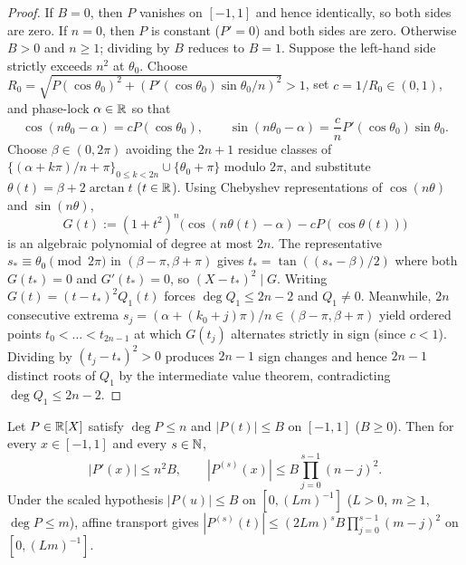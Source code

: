 \begin{proof}
If $B = 0$, then $P$ vanishes on $[-1, 1]$ and hence identically, so both sides are zero. If $n = 0$, then $P$ is constant ($P' = 0$) and both sides are zero. Otherwise $B > 0$ and $n \ge 1$; dividing by $B$ reduces to $B = 1$. Suppose the left-hand side strictly exceeds $n^2$ at $\theta_0$. Choose $R_0 = \sqrt{P(\cos\theta_0)^2 + (P'(\cos\theta_0)\sin\theta_0 / n)^2} > 1$, set $c = 1/R_0 \in (0, 1)$, and phase-lock $\alpha \in \mathbb{R}$ so that
\[
\cos(n\theta_0 - \alpha) = c P(\cos\theta_0), \qquad
\sin(n\theta_0 - \alpha) = \frac{c}{n} P'(\cos\theta_0)\sin\theta_0.
\]
Choose $\beta \in (0, 2\pi)$ avoiding the $2n + 1$ residue classes of $\{(\alpha + k\pi)/n + \pi\}_{0 \le k < 2n} \cup \{\theta_0 + \pi\}$ modulo $2\pi$, and substitute $\theta(t) = \beta + 2\arctan t$ ($t \in \mathbb{R}$). Using Chebyshev representations of $\cos(n\theta)$ and $\sin(n\theta)$,
\[
G(t) := (1 + t^2)^n \bigl(\cos(n\theta(t) - \alpha) - c P(\cos\theta(t))\bigr)
\]
is an algebraic polynomial of degree at most $2n$. The representative $s_* \equiv \theta_0 \pmod{2\pi}$ in $(\beta - \pi, \beta + \pi)$ gives $t_* = \tan((s_* - \beta)/2)$ where both $G(t_*) = 0$ and $G'(t_*) = 0$, so $(X - t_*)^2 \mid G$. Writing $G(t) = (t - t_*)^2 Q_1(t)$ forces $\deg Q_1 \le 2n - 2$ and $Q_1 \ne 0$. Meanwhile, $2n$ consecutive extrema $s_j = (\alpha + (k_0 + j)\pi)/n \in (\beta - \pi, \beta + \pi)$ yield ordered points $t_0 < \dots < t_{2n-1}$ at which $G(t_j)$ alternates strictly in sign (since $c < 1$). Dividing by $(t_j - t_*)^2 > 0$ produces $2n - 1$ sign changes and hence $2n - 1$ distinct roots of $Q_1$ by the intermediate value theorem, contradicting $\deg Q_1 \le 2n - 2$.
\end{proof}

\begin{theorem}
\label{thm:markov-interior}
\leanok
Let $P \in \mathbb{R}[X]$ satisfy $\deg P \le n$ and $|P(t)| \le B$ on $[-1, 1]$ ($B \ge 0$). Then for every $x \in [-1, 1]$ and every $s \in \mathbb{N}$,
\[
|P'(x)| \le n^2 B, \qquad
|P^{(s)}(x)| \le B \prod_{j=0}^{s-1} (n - j)^2.
\]
Under the scaled hypothesis $|P(u)| \le B$ on $[0, (Lm)^{-1}]$ ($L > 0$, $m \ge 1$, $\deg P \le m$), affine transport gives $|P^{(s)}(t)| \le (2Lm)^s B \prod_{j=0}^{s-1}(m - j)^2$ on $[0, (Lm)^{-1}]$.
\end{theorem}

